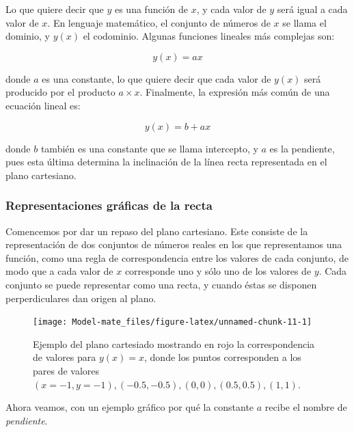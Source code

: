 \documentclass[
]{book}
\begin{document}
Lo que quiere decir que \(y\) es una función de \(x\), y cada valor de \(y\) será igual a cada valor de \(x\). En lenguaje matemático, el conjunto de números de \(x\) se llama el dominio, y \(y(x)\) el codominio. Algunas funciones lineales más complejas son:

\begin{equation}
    y(x) = ax
\end{equation}

donde \(a\) es una constante, lo que quiere decir que cada valor de \(y(x)\) será producido por el producto \(a \times x\). Finalmente, la expresión más común de una ecuación lineal es:

\begin{equation}
    y(x) = b + ax
\end{equation}

donde \(b\) también es una constante que se llama intercepto, y \(a\) es la pendiente, pues esta última determina la inclinación de la línea recta representada en el plano cartesiano.

\hypertarget{representaciones-gruxe1ficas-de-la-recta}{%
\subsubsection{Representaciones gráficas de la recta}\label{representaciones-gruxe1ficas-de-la-recta}}

Comencemos por dar un repaso del plano cartesiano. Este consiste de la representación de dos conjuntos de números reales en los que representamos una función, como una regla de correspondencia entre los valores de cada conjunto, de modo que a cada valor de \(x\) corresponde uno y sólo uno de los valores de \(y\). Cada conjunto se puede representar como una recta, y cuando éstas se disponen perperdiculares dan origen al plano.

\begin{figure}

{\centering \texttt{[image: Model-mate\_files/figure-latex/unnamed-chunk-11-1]} 

}

\caption{Ejemplo del plano cartesiado mostrando en rojo la correspondencia de valores para $y(x) = x$, donde los puntos corresponden a los pares de valores $(x = -1, y = -1), (-0.5, -0.5), (0, 0), (0.5, 0.5), (1, 1)$.}\label{fig:unnamed-chunk-11}
\end{figure}

Ahora veamos, con un ejemplo gráfico por qué la constante \(a\) recibe el nombre de \emph{pendiente}.
\end{document}
